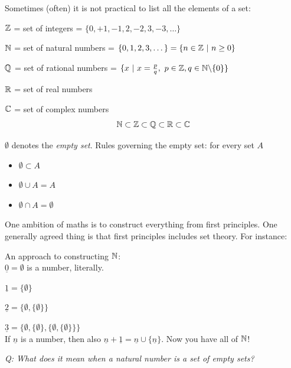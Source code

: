\documentclass[10pt]{scrartcl}
\begin{document}
Sometimes (often) it is not practical to list all the elements of a set: 
\begin{examples}	\shortskip
\item $\mathbb{Z}$ = set of integers = $\{0, +1,-1,2,-2,3,-3,\dots\}$	
\item $\mathbb{N}$ = set of natural numbers = $\{0, 1, 2, 3,\dots\} = \{n \in \mathbb{Z} ~|~ n \geq 0\}$	
\item $\mathbb{Q}$ = set of rational numbers = $\{x ~|~ x = \frac{p}{q},~ p \in \mathbb{Z}, q \in \mathbb{N}\backslash\{0\} \}$	
\item $\mathbb{R}$ = set of real numbers 	
\item $\mathbb{C}$ = set of complex numbers
 \[\mathbb{N} \subset \mathbb{Z} \subset \mathbb{Q} \subset \mathbb{R} \subset \mathbb{C}\]
\end{examples}

$\emptyset$ 
 denotes the \emph{empty set}. Rules governing the empty set: for every set $A$\shortskip
\begin{itemize}
\shortskip
\item $\emptyset \subset A$
\item $\emptyset \cup A = A$ 
\item $\emptyset \cap A = \emptyset$
\end{itemize}\vspace*{5pt}

One ambition of maths is to construct everything from first principles. One generally agreed thing is that first principles includes set theory. For instance: \\

\begin{example}
An approach to constructing $\mathbb{N}$:\\

$\underline{0} = \emptyset$ is a number, literally. 

$\underline{1} = \{\emptyset\}$ 

$\underline{2} = \{\emptyset,\{\emptyset\}\}$

$\underline{3} = \{\emptyset,\{\emptyset\},\{\emptyset,\{\emptyset\}\}\}$ \\
	
If $\underline{n}$ is a number, then also $\underline{n} + \underline{1} = \underline{n} \cup \{\underline{n}\}$. Now you have all of $\mathbb{N}$!
\end{example}
\setlength{\parskip}{5pt}

\emph{Q: What does it mean when a natural number is a set of empty sets?}\\
\end{document}
